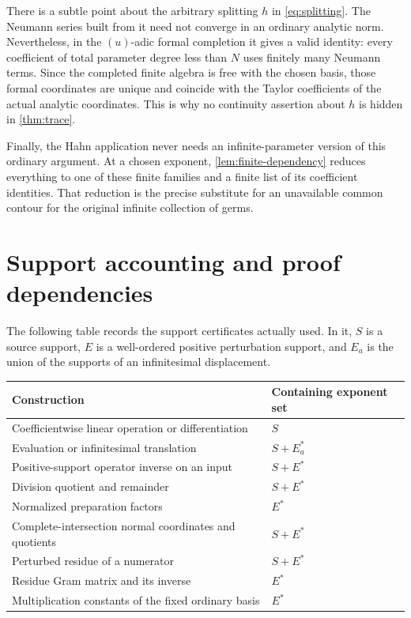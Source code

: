 \documentclass[11pt,letterpaper]{article}
\theoremstyle{definition}
\theoremstyle{remark}
\numberwithin{equation}{section}
\begin{document}
There is a subtle point about the arbitrary splitting $h$ in \eqref{eq:splitting}. The Neumann series built from it need not converge in an ordinary analytic norm. Nevertheless, in the $(u)$-adic formal completion it gives a valid identity: every coefficient of total parameter degree less than $N$ uses finitely many Neumann terms. Since the completed finite algebra is free with the chosen basis, those formal coordinates are unique and coincide with the Taylor coefficients of the actual analytic coordinates. This is why no continuity assertion about $h$ is hidden in \cref{thm:trace}.

Finally, the Hahn application never needs an infinite-parameter version of this ordinary argument. At a chosen exponent, \cref{lem:finite-dependency} reduces everything to one of these finite families and a finite list of its coefficient identities. That reduction is the precise substitute for an unavailable common contour for the original infinite collection of germs.

\section{Support accounting and proof dependencies}\label{app:support}

The following table records the support certificates actually used. In it, $S$ is a source support, $E$ is a well-ordered positive perturbation support, and $E_a$ is the union of the supports of an infinitesimal displacement.

\begin{center}\small
\begin{tabular}{@{}L{0.48\textwidth}L{0.43\textwidth}@{}}
\toprule
Construction & Containing exponent set\\
\midrule
Coefficientwise linear operation or differentiation & $S$\\[0.35em]
Evaluation or infinitesimal translation & $S+E_a^*$\\[0.35em]
Positive-support operator inverse on an input & $S+E^*$\\[0.35em]
Division quotient and remainder & $S+E^*$\\[0.35em]
Normalized preparation factors & $E^*$\\[0.35em]
Complete-intersection normal coordinates and quotients & $S+E^*$\\[0.35em]
Perturbed residue of a numerator & $S+E^*$\\[0.35em]
Residue Gram matrix and its inverse & $E^*$\\[0.35em]
Multiplication constants of the fixed ordinary basis & $E^*$\\
\bottomrule
\end{tabular}
\end{center}
\end{document}
